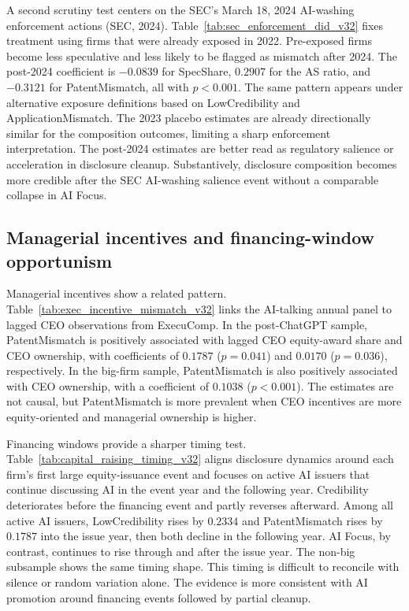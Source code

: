 A second scrutiny test centers on the SEC's March 18, 2024 AI-washing enforcement actions (SEC, 2024). Table~\ref{tab:sec_enforcement_did_v32} fixes treatment using firms that were already exposed in 2022. Pre-exposed firms become less speculative and less likely to be flagged as mismatch after 2024. The post-2024 coefficient is $-0.0839$ for SpecShare, $0.2907$ for the AS ratio, and $-0.3121$ for PatentMismatch, all with $p<0.001$. The same pattern appears under alternative exposure definitions based on LowCredibility and ApplicationMismatch. The 2023 placebo estimates are already directionally similar for the composition outcomes, limiting a sharp enforcement interpretation. The post-2024 estimates are better read as regulatory salience or acceleration in disclosure cleanup. Substantively, disclosure composition becomes more credible after the SEC AI-washing salience event without a comparable collapse in AI Focus.



\subsection{Managerial incentives and financing-window opportunism}

Managerial incentives show a related pattern. Table~\ref{tab:exec_incentive_mismatch_v32} links the AI-talking annual panel to lagged CEO observations from ExecuComp. In the post-ChatGPT sample, PatentMismatch is positively associated with lagged CEO equity-award share and CEO ownership, with coefficients of $0.1787$ ($p=0.041$) and $0.0170$ ($p=0.036$), respectively. In the big-firm sample, PatentMismatch is also positively associated with CEO ownership, with a coefficient of $0.1038$ ($p<0.001$). The estimates are not causal, but PatentMismatch is more prevalent when CEO incentives are more equity-oriented and managerial ownership is higher.



Financing windows provide a sharper timing test. Table~\ref{tab:capital_raising_timing_v32} aligns disclosure dynamics around each firm's first large equity-issuance event and focuses on active AI issuers that continue discussing AI in the event year and the following year. Credibility deteriorates before the financing event and partly reverses afterward. Among all active AI issuers, LowCredibility rises by $0.2334$ and PatentMismatch rises by $0.1787$ into the issue year, then both decline in the following year. AI Focus, by contrast, continues to rise through and after the issue year. The non-big subsample shows the same timing shape. This timing is difficult to reconcile with silence or random variation alone. The evidence is more consistent with AI promotion around financing events followed by partial cleanup.

